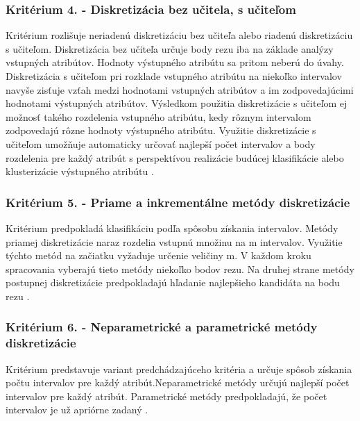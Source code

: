 \subsubsection*{Kritérium 4. - Diskretizácia bez učitela, s učiteľom}
Kritérium rozlišuje neriadenú diskretizáciu bez učiteľa alebo riadenú diskretizáciu s učiteľom. Diskretizácia bez učiteľa určuje body rezu iba na základe analýzy vstupných atribútov. Hodnoty výstupného atribútu sa pritom neberú do úvahy. Diskretizácia s učiteľom pri rozklade vstupného atribútu na niekoľko intervalov navyše zisťuje vzťah medzi hodnotami vstupných atribútov a im zodpovedajúcimi hodnotami výstupných atribútov. Výsledkom použitia diskretizácie s učiteľom ej možnosť takého rozdelenia vstupného atribútu, kedy rôznym intervalom zodpovedajú rôzne hodnoty výstupného atribútu. Využitie diskretizácie s učiteľom umožňuje automaticky určovať najlepší počet intervalov a body rozdelenia pre každý atribút s perspektívou realizácie budúcej klasifikácie alebo klusterizácie výstupného atribútu %
\cite{levashenkoProj}.
\subsubsection*{Kritérium 5. - Priame a inkrementálne metódy diskretizácie}
Kritérium predpokladá klasifikáciu podľa spôsobu získania intervalov. Metódy priamej diskretizácie naraz rozdelia vstupnú množinu na m intervalov. Využitie týchto metód na začiatku vyžaduje určenie veličiny m. V každom kroku spracovania vyberajú tieto metódy niekoľko bodov rezu. Na druhej strane metódy postupnej diskretizácie predpokladajú hľadanie najlepšieho kandidáta na bodu rezu \cite{levashenkoProj}.
\subsubsection*{Kritérium 6. - Neparametrické a parametrické metódy diskretizácie }
Kritérium predstavuje variant predchádzajúceho kritéria a určuje spôsob získania počtu intervalov pre každý atribút.Neparametrické metódy určujú najlepší počet intervalov pre každý atribút. Parametrické metódy predpokladajú, že počet intervalov je už apriórne zadaný 
\cite{levashenkoProj}.

